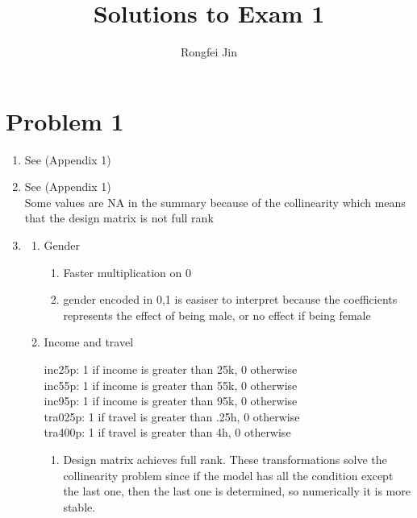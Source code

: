 \documentclass{article}
\title{Solutions to Exam 1 }
\author{Rongfei Jin}
\begin{document}
\pagestyle{fancy}
\fancyhf{}%
\fancyfoot[C]{\thepage}%
 
\maketitle

\section*{Problem 1}
\begin{enumerate}[label=(\alph*)]
  \item See (Appendix 1)
  \item See (Appendix 1) \\
  Some values are NA in the summary because of the collinearity which means that the design matrix is not full rank
  \item
    \begin{enumerate}[label=(\arabic*)]

      \item Gender
        \begin{enumerate}[label=(\roman*)]
          \item Faster multiplication on 0
          \item
            gender encoded in 0,1 is easiser to interpret because the coefficients represents the effect of being male, or no effect if being female
        \end{enumerate}
      \item Income and travel


        inc25p: 1 if income is greater than 25k, 0 otherwise \\
        inc55p: 1 if income is greater than 55k, 0 otherwise \\
        inc95p: 1 if income is greater than 95k, 0 otherwise \\
        tra025p: 1 if travel is greater than .25h, 0 otherwise \\
        tra400p: 1 if travel is greater than 4h, 0 otherwise \\

        \begin{enumerate}[label=(\roman*)]
          \item Design matrix achieves full rank.
            These transformations solve the collinearity problem since if the model has all the condition except the last one, then the last one is determined, so numerically it is more stable.


\end{enumerate}
\end{enumerate}
\end{enumerate}
\end{document}
